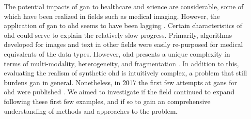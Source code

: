         The potential impacts of \gls{gan} to healthcare and science are considerable, some of which have been realized in fields such as medical imaging. However, the application of \gls{gan} to \gls{ohd} seems to have been lagging \cite{Xiao_2018_chall}. Certain characteristics of \gls{ohd} could serve to explain the relatively slow progress. Primarily, algorithms developed for images and text in other fields were easily re-purposed for medical equivalents of the data types. However, \gls{ohd} presents a unique complexity in terms of multi-modality, heterogeneity, and fragmentation \cite{Xiao_2018_chall}. In addition to this, evaluating the realism of synthetic \gls{ohd} is intuitively complex, a problem that still burdens \gls{gan} in general. Nonetheless, in 2017 the first few attempts at \glspl{gan} for \gls{ohd} were published \cite{esteban2017real,Che_2017,Choi2017-nt,yahi2017generative}. We aimed to investigate if the field continued to expand following these first few examples, and if so to gain an comprehensive understanding of methods and approaches to the problem.